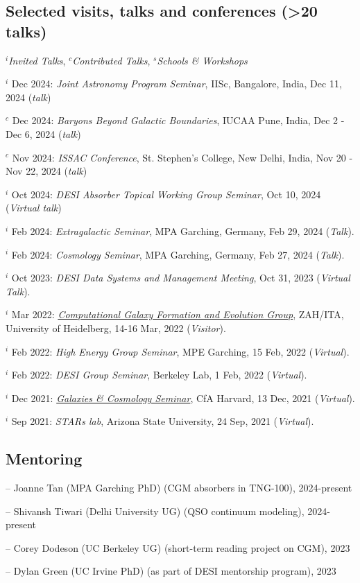 \documentclass[12pt,letterpaper]{article}
\begin{document}
\subsection{Selected visits, talks and conferences (>20 talks)}
$^i$\emph{Invited Talks}, $^c$\emph{Contributed Talks}, $^s$\emph{Schools \& Workshops}
\begin{list}{}{\cvlist}
\item $^i$ Dec 2024:  \emph{Joint Astronomy Program Seminar}, IISc, Bangalore, India, Dec 11, 2024 (\textit{talk})
\item $^c$ Dec 2024:  \emph{Baryons Beyond Galactic Boundaries}, IUCAA Pune, India, Dec 2 - Dec 6, 2024 (\textit{talk})
\item $^c$ Nov 2024:  \emph{ISSAC Conference}, St. Stephen's College, New Delhi, India, Nov 20 - Nov 22, 2024 (\textit{talk})
\item $^i$ Oct 2024:  \emph{DESI Absorber Topical Working Group Seminar}, Oct 10, 2024 (\textit{Virtual talk})
\item $^i$ Feb 2024:  \emph{Extragalactic Seminar}, MPA Garching, Germany, Feb 29, 2024 (\textit{Talk}).
\item $^i$ Feb 2024:  \emph{Cosmology Seminar}, MPA Garching, Germany, Feb 27, 2024 (\textit{Talk}).
 \item $^i$ Oct 2023:  \emph{DESI Data Systems and Management Meeting}, Oct 31, 2023 (\textit{Virtual Talk}).
\item $^i$ Mar 2022:  \emph{\href{https://zah.uni-heidelberg.de/research-groups\#c2659}{Computational Galaxy Formation and Evolution Group}}, ZAH/ITA, University of Heidelberg, 14-16 Mar, 2022 (\textit{Visitor}).
\item $^i$ Feb 2022:  \emph{High Energy Group Seminar}, MPE Garching, 15 Feb, 2022 (\textit{Virtual}).
\item $^i$ Feb 2022:  \emph{DESI Group Seminar}, Berkeley Lab, 1 Feb, 2022 (\textit{Virtual}).
\item $^i$ Dec 2021:  \emph{\href{https://pweb.cfa.harvard.edu/calendar/event/9298}{Galaxies \& Cosmology Seminar}}, CfA Harvard, 13 Dec, 2021 (\textit{Virtual}).
\item $^i$ Sep 2021:  \textit{STARs lab}, Arizona State University, 24 Sep, 2021 (\textit{Virtual}).

\end{list}

\subsection{Mentoring}
\begin{list}{}{\cvlist}
\item -- Joanne Tan (MPA Garching PhD) (CGM absorbers in TNG-100), 2024-present
\item -- Shivansh Tiwari (Delhi University UG) (QSO continuum modeling), 2024-present
\item -- Corey Dodeson (UC Berkeley UG) (short-term reading project on CGM), 2023
\item -- Dylan Green (UC Irvine PhD) (as part of DESI mentorship program), 2023
\end{list}
\end{document}
